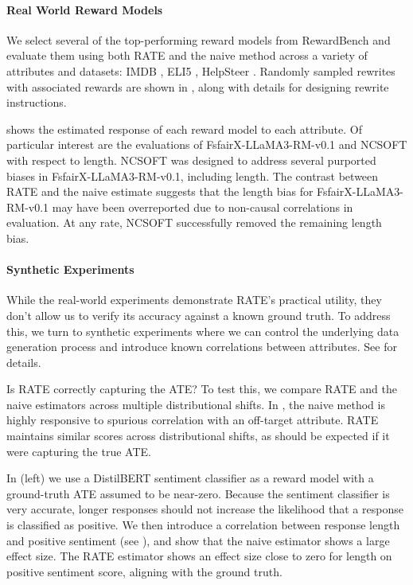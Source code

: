 \documentclass{article}
\begin{document}
\paragraph{Real World Reward Models}
We select several of the top-performing reward models from RewardBench \citep{lambert2024rewardbenchevaluatingrewardmodels} and evaluate them using both RATE and the naive method across a variety of attributes and datasets: IMDB \citep{maas-EtAl:2011:ACL-HLT2011}, ELI5 \citep{eli5_lfqa}, HelpSteer \citep{wang2023helpsteer}. Randomly sampled rewrites with associated rewards are shown in , along with details for designing rewrite instructions.

 shows the estimated response of each reward model to each attribute. Of particular interest are the evaluations of FsfairX-LLaMA3-RM-v0.1 \citep{dong2023raft} and NCSOFT \citep{park2024offsetbias} with respect to length. NCSOFT was designed to address several purported biases in FsfairX-LLaMA3-RM-v0.1, including length. 
The contrast between RATE and the naive estimate suggests that the length bias for FsfairX-LLaMA3-RM-v0.1 may have been overreported due to non-causal correlations in evaluation. At any rate, NCSOFT successfully removed the remaining length bias.

\paragraph{Synthetic Experiments}
\label{sec:synthetic}
While the real-world experiments demonstrate RATE's practical utility, they don't allow us to verify its accuracy against a known ground truth. To address this, we turn to synthetic experiments where we can control the underlying data generation process and introduce known correlations between attributes. See  for details.

Is RATE correctly capturing the ATE? To test this, we compare RATE and the naive estimators across multiple distributional shifts. In , the naive method is highly responsive to spurious correlation with an off-target attribute. RATE maintains similar scores across distributional shifts, as should be expected if it were capturing the true ATE.

In  (left) we use a DistilBERT sentiment classifier \citep{socher-etal-2013-recursive, sanh2020distilbertdistilledversionbert} as a reward model with a ground-truth ATE assumed to be near-zero. Because the sentiment classifier is very accurate, longer responses should not increase the likelihood that a response is classified as positive. We then introduce a correlation between response length and positive sentiment (see ), and show that the naive estimator shows a large effect size. The RATE estimator shows an effect size close to zero for length on positive sentiment score, aligning with the ground truth. 
\end{document}
